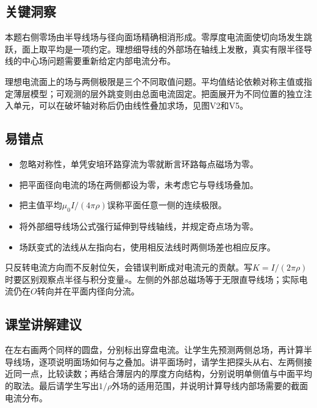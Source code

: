 \documentclass[UTF8,fontset=fandol,a4paper,11pt]{ctexart}
\begin{document}


\subsection*{关键洞察}

本题右侧零场由半导线场与径向面场精确相消形成。零厚度电流面使切向场发生跳跃，面上取平均是一项约定。理想细导线的外部场在轴线上发散，真实有限半径导线的中心场问题需要重新给定内部电流分布。

理想电流面上的场与两侧极限是三个不同取值问题。平均值结论依赖对称主值或指定薄层模型；可观测的层外跳变则由总面电流固定。把面展开为不同位置的独立注入单元，可以在破坏轴对称后仍由线性叠加求场，见图V2和V5。



\subsection*{易错点}

\begin{itemize}
\item 忽略对称性，单凭安培环路穿流为零就断言环路每点磁场为零。
\item 把平面径向电流的场在两侧都设为零，未考虑它与导线场叠加。
\item 把主值平均$\mu_0I/(4\pi\rho)$误称平面任意一侧的连续极限。
\item 将外部细导线场公式强行延伸到导线轴线，并规定奇点场为零。
\item 场跃变式的法线从左指向右，使用相反法线时两侧场差也相应反序。
\end{itemize}

只反转电流方向而不反射位矢，会错误判断成对电流元的贡献。写$K=I/(2\pi\rho)$时要区别观察点半径与积分变量$s$。左侧的外部总磁场等于无限直导线场；实际电流仍在$O$转向并在平面内径向分流。



\subsection*{课堂讲解建议}

在左右画两个同样的圆盘，分别标出穿盘电流。让学生先预测两侧总场，再计算半导线场，逐项说明面场如何与之叠加。讲平面场时，请学生把探头从右、左两侧接近同一点，比较读数；再结合薄层内的厚度方向结构，分别说明单侧值与中面平均的取法。最后请学生写出$1/\rho$外场的适用范围，并说明计算导线内部场需要的截面电流分布。
\end{document}
